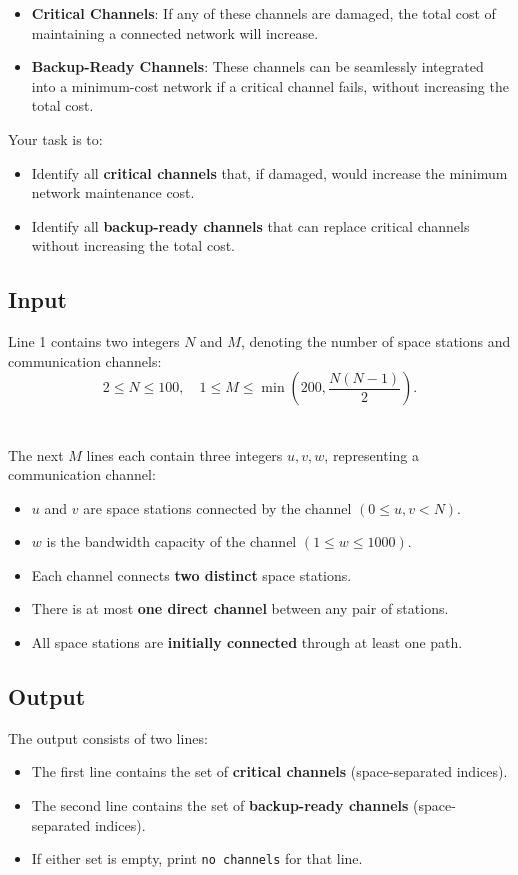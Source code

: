 \documentclass[12pt,a4paper]{article}
\begin{document}
\begin{itemize}
    \item \textbf{Critical Channels}: If any of these channels are damaged, the total cost of maintaining a connected network will increase.
    \item \textbf{Backup-Ready Channels}: These channels can be seamlessly integrated into a minimum-cost network if a critical channel fails, without increasing the total cost.
\end{itemize}

\noindent
Your task is to:
\begin{itemize}
    \item Identify all \textbf{critical channels }that, if damaged, would increase the minimum network maintenance cost.
    \item Identify all \textbf{backup-ready channels} that can replace critical channels without increasing the total cost.
\end{itemize}

\subsection*{\fontsize{16}{12}Input}
Line 1 contains two integers \( N \) and \( M \), denoting the number of space stations and communication channels:
    \[
    2 \leq N \leq 100, \quad 1 \leq M \leq \min(200, \frac{N(N-1)}{2}).
    \]
\\\\
\noindent
The next \( M \) lines each contain three integers \( u, v, w \), representing a communication channel:
    \begin{itemize}
        \item \( u \) and \( v \) are space stations connected by the channel \((0 \leq u, v < N)\).
        \item \( w \) is the bandwidth capacity of the channel \((1 \leq w \leq 1000)\).
        \item Each channel connects \textbf{two distinct} space stations.
        \item There is at most \textbf{one direct channel} between any pair of stations.
        \item All space stations are \textbf{initially connected} through at least one path.
    \end{itemize}

\subsection*{\fontsize{16}{12}Output}
The output consists of two lines:
\begin{itemize}
    \item The first line contains the set of \textbf{critical channels} (space-separated indices).
    \item The second line contains the set of \textbf{backup-ready channels} (space-separated indices).
    \item If either set is empty, print \texttt{no channels} for that line.
\end{itemize}
\end{document}
